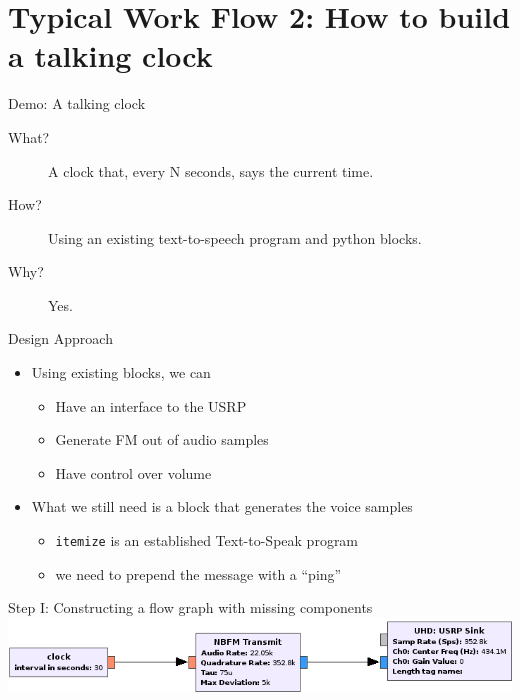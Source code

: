\documentclass{beamer}
\begin{document}
\section{Typical Work Flow 2: How to build a talking clock}
\begin{frame}{Demo: A talking clock}
  \begin{description}
    \item[What?] A clock that, every N seconds, says the current time.\pause
    \item[How?] Using an existing text-to-speech program and python blocks.\pause
    \item[Why?] Yes.
  \end{description}
\end{frame}
\begin{frame}{Design Approach}
  \begin{itemize}
    \item Using existing blocks, we can 
      \begin{itemize}
        \item Have an interface to the USRP
        \item Generate FM out of audio samples
        \item Have control over volume
      \end{itemize}
    \item What we still need is a block that generates the voice samples
      \begin{itemize}
        \item \texttt{itemize} is an established Text-to-Speak program
        \item we need to prepend the message with a ``ping''
      \end{itemize}
  \end{itemize}
\end{frame}
\begin{frame}{Step I: Constructing a flow graph with missing components}
  \includegraphics[width=\textwidth]{clockfg.png}
\end{frame}
\end{document}
